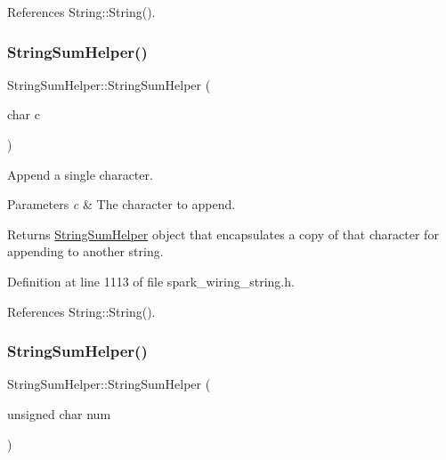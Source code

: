 References String\+::\+String().

\mbox{\label{class_string_sum_helper_a529d5741ae2d4afeaa3068bff4f3b599}} 
\subsubsection{\texorpdfstring{String\+Sum\+Helper()}{StringSumHelper()}\hspace{0.1cm}{\footnotesize\ttfamily [3/8]}}
{\footnotesize\ttfamily String\+Sum\+Helper\+::\+String\+Sum\+Helper (\begin{DoxyParamCaption}\item[{char}]{c }\end{DoxyParamCaption})\hspace{0.3cm}{\ttfamily [inline]}}



Append a single character. 


\begin{DoxyParams}{Parameters}
{\em c} & The character to append.\\
\hline
\end{DoxyParams}
\begin{DoxyReturn}{Returns}
\hyperlink{class_string_sum_helper}{String\+Sum\+Helper} object that encapsulates a copy of that character for appending to another string. 
\end{DoxyReturn}


Definition at line 1113 of file spark\+\_\+wiring\+\_\+string.\+h.



References String\+::\+String().

\mbox{\label{class_string_sum_helper_ac8f1e6c222659795a6aca08ad0872bec}} 
\subsubsection{\texorpdfstring{String\+Sum\+Helper()}{StringSumHelper()}\hspace{0.1cm}{\footnotesize\ttfamily [4/8]}}
{\footnotesize\ttfamily String\+Sum\+Helper\+::\+String\+Sum\+Helper (\begin{DoxyParamCaption}\item[{unsigned char}]{num }\end{DoxyParamCaption})\hspace{0.3cm}{\ttfamily [inline]}}



